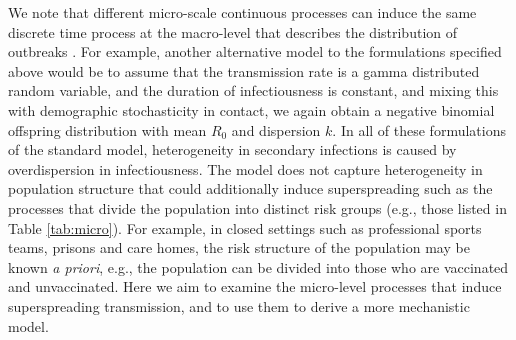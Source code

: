 \documentclass{imammb}
\numberwithin{equation}{section}
\begin{document}
We note that different micro-scale continuous processes can induce the same discrete time process at the macro-level that describes the distribution of outbreaks \citep{Mode2000-hp, Garske2008-ax, Yan2008-jc}. For example, another alternative model to the formulations specified above would be to assume that the transmission rate is a gamma distributed random variable, and the duration of infectiousness is constant, and mixing this with demographic stochasticity in contact, we again obtain a negative binomial offspring distribution with mean $R_0$ and dispersion $k$. In all of these formulations of the standard model, heterogeneity in secondary infections is caused by overdispersion in infectiousness. The model does not capture heterogeneity in population structure that could additionally induce superspreading such as the processes that divide the population into distinct risk groups (e.g., those listed in Table \ref{tab:micro}). For example, in closed settings such as professional sports teams, prisons  and care homes, the risk structure of the population may be known \textit{a priori}, e.g., the population can be divided into those who are vaccinated and unvaccinated. Here we aim to examine the micro-level processes that induce superspreading transmission, and to use them to derive a more mechanistic model. 



 
\end{document}
